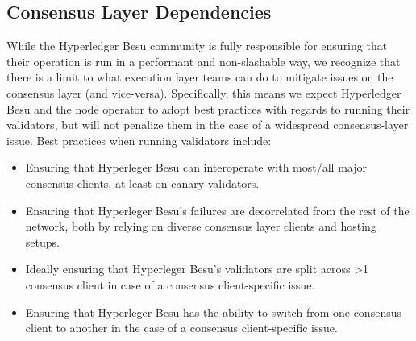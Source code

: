 \subsection{Consensus Layer Dependencies}
While the Hyperledger Besu community is fully responsible for ensuring that their operation is run in a performant and non-slashable way, we recognize that there is a limit to what execution layer teams can do to mitigate issues on the consensus layer (and vice-versa). Specifically, this means we expect Hyperledger Besu and the node operator to adopt best practices with regards to running their validators, but will not penalize them in the case of a widespread consensus-layer issue. Best practices when running validators include:
\begin{itemize}
\item Ensuring that Hyperleger Besu can interoperate with most/all major consensus clients, at least on canary validators.
\item Ensuring that Hyperleger Besu’s failures are decorrelated from the rest of the network, both by relying on diverse consensus layer clients and hosting setups.
\item Ideally ensuring that Hyperleger Besu’s validators are split across >1 consensus client in case of a consensus client-specific issue.
\item Ensuring that Hyperleger Besu has the ability to switch from one consensus client to another in the case of a consensus client-specific issue.
\end{itemize}